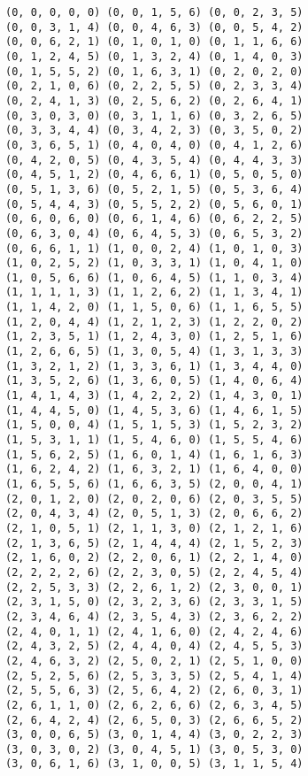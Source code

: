 \documentclass[11pt]{article}
\begin{document}
    \begin{Verbatim}[commandchars=\\\{\}]
(0, 0, 0, 0, 0) (0, 0, 1, 5, 6) (0, 0, 2, 3, 5)
(0, 0, 3, 1, 4) (0, 0, 4, 6, 3) (0, 0, 5, 4, 2)
(0, 0, 6, 2, 1) (0, 1, 0, 1, 0) (0, 1, 1, 6, 6)
(0, 1, 2, 4, 5) (0, 1, 3, 2, 4) (0, 1, 4, 0, 3)
(0, 1, 5, 5, 2) (0, 1, 6, 3, 1) (0, 2, 0, 2, 0)
(0, 2, 1, 0, 6) (0, 2, 2, 5, 5) (0, 2, 3, 3, 4)
(0, 2, 4, 1, 3) (0, 2, 5, 6, 2) (0, 2, 6, 4, 1)
(0, 3, 0, 3, 0) (0, 3, 1, 1, 6) (0, 3, 2, 6, 5)
(0, 3, 3, 4, 4) (0, 3, 4, 2, 3) (0, 3, 5, 0, 2)
(0, 3, 6, 5, 1) (0, 4, 0, 4, 0) (0, 4, 1, 2, 6)
(0, 4, 2, 0, 5) (0, 4, 3, 5, 4) (0, 4, 4, 3, 3)
(0, 4, 5, 1, 2) (0, 4, 6, 6, 1) (0, 5, 0, 5, 0)
(0, 5, 1, 3, 6) (0, 5, 2, 1, 5) (0, 5, 3, 6, 4)
(0, 5, 4, 4, 3) (0, 5, 5, 2, 2) (0, 5, 6, 0, 1)
(0, 6, 0, 6, 0) (0, 6, 1, 4, 6) (0, 6, 2, 2, 5)
(0, 6, 3, 0, 4) (0, 6, 4, 5, 3) (0, 6, 5, 3, 2)
(0, 6, 6, 1, 1) (1, 0, 0, 2, 4) (1, 0, 1, 0, 3)
(1, 0, 2, 5, 2) (1, 0, 3, 3, 1) (1, 0, 4, 1, 0)
(1, 0, 5, 6, 6) (1, 0, 6, 4, 5) (1, 1, 0, 3, 4)
(1, 1, 1, 1, 3) (1, 1, 2, 6, 2) (1, 1, 3, 4, 1)
(1, 1, 4, 2, 0) (1, 1, 5, 0, 6) (1, 1, 6, 5, 5)
(1, 2, 0, 4, 4) (1, 2, 1, 2, 3) (1, 2, 2, 0, 2)
(1, 2, 3, 5, 1) (1, 2, 4, 3, 0) (1, 2, 5, 1, 6)
(1, 2, 6, 6, 5) (1, 3, 0, 5, 4) (1, 3, 1, 3, 3)
(1, 3, 2, 1, 2) (1, 3, 3, 6, 1) (1, 3, 4, 4, 0)
(1, 3, 5, 2, 6) (1, 3, 6, 0, 5) (1, 4, 0, 6, 4)
(1, 4, 1, 4, 3) (1, 4, 2, 2, 2) (1, 4, 3, 0, 1)
(1, 4, 4, 5, 0) (1, 4, 5, 3, 6) (1, 4, 6, 1, 5)
(1, 5, 0, 0, 4) (1, 5, 1, 5, 3) (1, 5, 2, 3, 2)
(1, 5, 3, 1, 1) (1, 5, 4, 6, 0) (1, 5, 5, 4, 6)
(1, 5, 6, 2, 5) (1, 6, 0, 1, 4) (1, 6, 1, 6, 3)
(1, 6, 2, 4, 2) (1, 6, 3, 2, 1) (1, 6, 4, 0, 0)
(1, 6, 5, 5, 6) (1, 6, 6, 3, 5) (2, 0, 0, 4, 1)
(2, 0, 1, 2, 0) (2, 0, 2, 0, 6) (2, 0, 3, 5, 5)
(2, 0, 4, 3, 4) (2, 0, 5, 1, 3) (2, 0, 6, 6, 2)
(2, 1, 0, 5, 1) (2, 1, 1, 3, 0) (2, 1, 2, 1, 6)
(2, 1, 3, 6, 5) (2, 1, 4, 4, 4) (2, 1, 5, 2, 3)
(2, 1, 6, 0, 2) (2, 2, 0, 6, 1) (2, 2, 1, 4, 0)
(2, 2, 2, 2, 6) (2, 2, 3, 0, 5) (2, 2, 4, 5, 4)
(2, 2, 5, 3, 3) (2, 2, 6, 1, 2) (2, 3, 0, 0, 1)
(2, 3, 1, 5, 0) (2, 3, 2, 3, 6) (2, 3, 3, 1, 5)
(2, 3, 4, 6, 4) (2, 3, 5, 4, 3) (2, 3, 6, 2, 2)
(2, 4, 0, 1, 1) (2, 4, 1, 6, 0) (2, 4, 2, 4, 6)
(2, 4, 3, 2, 5) (2, 4, 4, 0, 4) (2, 4, 5, 5, 3)
(2, 4, 6, 3, 2) (2, 5, 0, 2, 1) (2, 5, 1, 0, 0)
(2, 5, 2, 5, 6) (2, 5, 3, 3, 5) (2, 5, 4, 1, 4)
(2, 5, 5, 6, 3) (2, 5, 6, 4, 2) (2, 6, 0, 3, 1)
(2, 6, 1, 1, 0) (2, 6, 2, 6, 6) (2, 6, 3, 4, 5)
(2, 6, 4, 2, 4) (2, 6, 5, 0, 3) (2, 6, 6, 5, 2)
(3, 0, 0, 6, 5) (3, 0, 1, 4, 4) (3, 0, 2, 2, 3)
(3, 0, 3, 0, 2) (3, 0, 4, 5, 1) (3, 0, 5, 3, 0)
(3, 0, 6, 1, 6) (3, 1, 0, 0, 5) (3, 1, 1, 5, 4)

\end{Verbatim}
\end{document}
